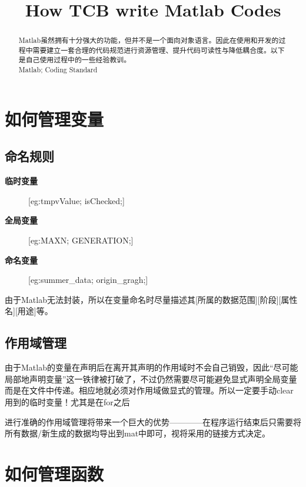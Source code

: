 \documentclass[12pt]{article}
\title{\fontsize{18pt}{27pt}\selectfont
    {\heiti    
        How TCB write Matlab Codes}\vspace{0em}}
\author{\fontsize{12pt}{18pt}}
\date{}
\newcommand{\red}[1]{\textcolor[rgb]{1.00,0.00,0.00}{#1}}
\begin{document}
    \maketitle
    \begin{abstract}
        Matlab虽然拥有十分强大的功能，但并不是一个面向对象语言。因此在使用和开发的过程中需要建立一套合理的代码规范进行资源管理、提升代码可读性与降低耦合度。以下是自己使用过程中的一些经验教训。\\
        
        \noindent {}Matlab; Coding Standard
    \end {abstract}
    \tableofcontents
    \section{如何管理变量}
        \subsection{命名规则}
        \begin{description}
            \item[\textbf{临时变量}]
                       [eg:tmpvValue;  isChecked;]
            \item[\textbf{全局变量}]
                     [eg:MAXN;   GENERATION;]
            \item[\textbf{命名变量}] 
                     [eg:summer\_data;    origin\_gragh;]
        \end{description}

        由于Matlab无法封装，所以在变量命名时尽量描述其[所属的数据范围][阶段][属性名][用途]等。

        \subsection{作用域管理}
        由于Matlab的变量在声明后在离开其声明的作用域时不会自己销毁，因此“尽可能局部地声明变量”这一铁律被打破了，不过仍然需要尽可能避免显式声明全局变量而是在文件中传递。相应地就必须对作用域做显式的管理。所以\red{一定要手动clear用到的临时变量！}尤其是在for之后

        进行准确的作用域管理将带来一个巨大的优势————在程序运行结束后只需要将所有数据/新生成的数据均导出到mat中即可，视将采用的链接方式决定。
    \section{如何管理函数}
\end{document}
